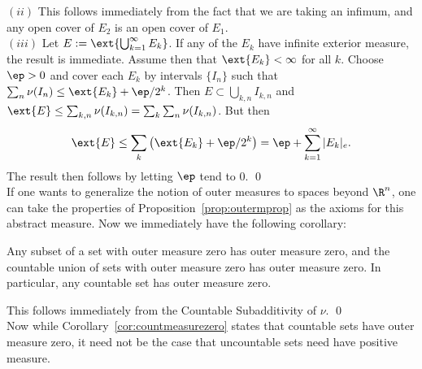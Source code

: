 \noindent$(ii)$ This follows immediately from the fact that we are taking an infimum, and any open cover of $E_2$ is an open cover of $E_1$. \\

\noindent$(iii)$ Let $E:=\ext{\bigcup_{k=1}^\infty E_k}$. If any of the $E_k$ have infinite exterior measure, the result is immediate. Assume then that $\ext{E_k}<\infty$ for all $k$. Choose $\ep>0$ and cover each $E_k$ by intervals $\{I_n\}$ such that $\sum_n \nu(I_n) \leq \ext{E_k} + \ep/2^k$. Then $E \subset \bigcup_{k,n} I_{k,n}$ and $\ext{E} \leq \sum_{k,n} \nu(I_{k,n})= \sum_k \sum_n \nu(I_{k,n})$. But then 
	\[
	\ext{E} \leq \sum_k \left( \ext{E_k} + \ep/2^k \right)= \ep + \sum_{k=1}^\infty |E_k|_e.
	\]
The result then follows by letting $\ep$ tend to 0. \qed \\


If one wants to generalize the notion of outer measures to spaces beyond $\R^n$, one can take the properties of Proposition~\ref{prop:outermprop} as the axioms for this abstract measure. Now we immediately have the following corollary:


\begin{cor} \label{cor:countmeasurezero}
Any subset of a set with outer measure zero has outer measure zero, and the countable union of sets with outer measure zero has outer measure zero. In particular, any countable set has outer measure zero. 
\end{cor}

\pf This follows immediately from the Countable Subadditivity of $\nu$. \qed \\


\noindent Now while Corollary~\ref{cor:countmeasurezero} states that countable sets have outer measure zero, it need not be the case that uncountable sets need have positive measure. 


